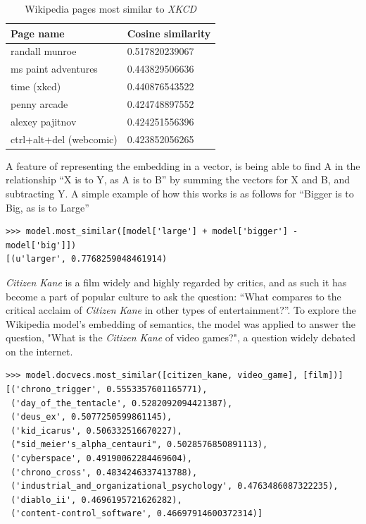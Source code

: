 \documentclass[11pt]{article}
\begin{document}
\begin{table}[h]
  \begin{center}
    \begin{tabular}{l l}
      Page name & Cosine similarity\\
      \hline
      randall munroe & 0.517820239067\\
      ms paint adventures & 0.443829506636\\
      time (xkcd)  & 0.440876543522\\
      penny arcade & 0.424748897552\\
      alexey pajitnov & 0.424251556396\\
      ctrl+alt+del (webcomic)  & 0.423852056265\\
    \end{tabular}
  \caption{Wikipedia pages most similar to \emph{XKCD}}
  \label{tab:xkcd}
  \end{center}
\end{table}

A feature of representing the embedding in a vector, is being able to find A in the relationship ``X is to Y, as A is to B'' by summing the vectors for X and B, and subtracting Y.
A simple example of how this works is as follows for
``Bigger is to Big, as \underline{\hspace{30pt}} is to Large''
\begin{verbatim}
>>> model.most_similar([model['large'] + model['bigger'] - model['big']])
[(u'larger', 0.7768259048461914)
\end{verbatim}

\emph{Citizen Kane} is a film widely and highly regarded by critics, and as such it has become a part of popular culture to ask the question: ``What compares to the critical acclaim of \emph{Citizen Kane} in other types of entertainment?''. To explore the Wikipedia model's embedding of semantics, the model was applied to answer the question, "What is the \emph{Citizen Kane} of video games?", a question widely debated on the internet.

\begin{verbatim}
>>> model.docvecs.most_similar([citizen_kane, video_game], [film])]
[('chrono_trigger', 0.5553357601165771),
 ('day_of_the_tentacle', 0.5282092094421387),
 ('deus_ex', 0.5077250599861145),
 ('kid_icarus', 0.506332516670227),
 ("sid_meier's_alpha_centauri", 0.5028576850891113),
 ('cyberspace', 0.49190062284469604),
 ('chrono_cross', 0.4834246337413788),
 ('industrial_and_organizational_psychology', 0.4763486087322235),
 ('diablo_ii', 0.4696195721626282),
 ('content-control_software', 0.46697914600372314)]
\end{verbatim}
\end{document}
